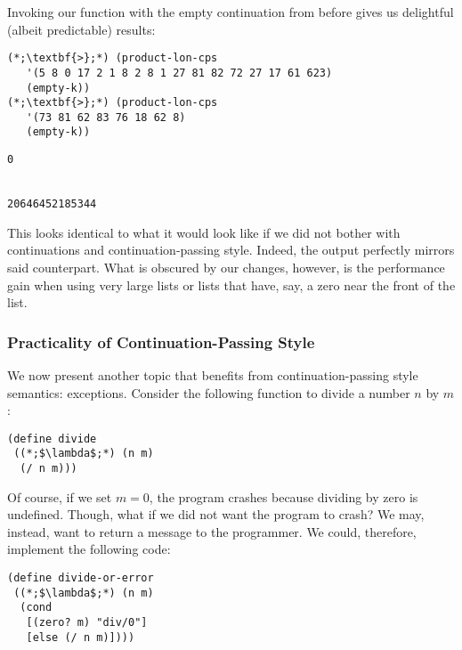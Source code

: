 Invoking our function with the empty continuation from before gives us delightful (albeit predictable) results:
\begin{clo}[]{}\begin{lstlisting}[language=MyScheme]
(*;\textbf{>};*) (product-lon-cps 
   '(5 8 0 17 2 1 8 2 8 1 27 81 82 72 27 17 61 623) 
   (empty-k))
(*;\textbf{>};*) (product-lon-cps 
   '(73 81 62 83 76 18 62 8) 
   (empty-k))
\end{lstlisting}
\tcblower
\begin{lstlisting}[language=MyOutput]
0


20646452185344
\end{lstlisting}
\end{clo}

This looks identical to what it would look like if we did not bother with continuations and continuation-passing style. Indeed, the output perfectly mirrors said counterpart. What is obscured by our changes, however, is the performance gain when using very large lists or lists that have, say, a zero near the front of the list.

\subsubsection*{Practicality of Continuation-Passing Style}

We now present another topic that benefits from continuation-passing style semantics: exceptions. Consider the following function to divide a number $n$ by $m$:

\begin{cl}[]{}\begin{lstlisting}[language=MyScheme]
(define divide
 ((*;$\lambda$;*) (n m)
  (/ n m)))
\end{lstlisting}\end{cl}

Of course, if we set $m=0$, the program crashes because dividing by zero is undefined. Though, what if we did not want the program to crash? We may, instead, want to return a message to the programmer. We could, therefore, implement the following code:

\begin{cl}[]{}\begin{lstlisting}[language=MyScheme]
(define divide-or-error
 ((*;$\lambda$;*) (n m)
  (cond
   [(zero? m) "div/0"]
   [else (/ n m)])))
\end{lstlisting}\end{cl}

